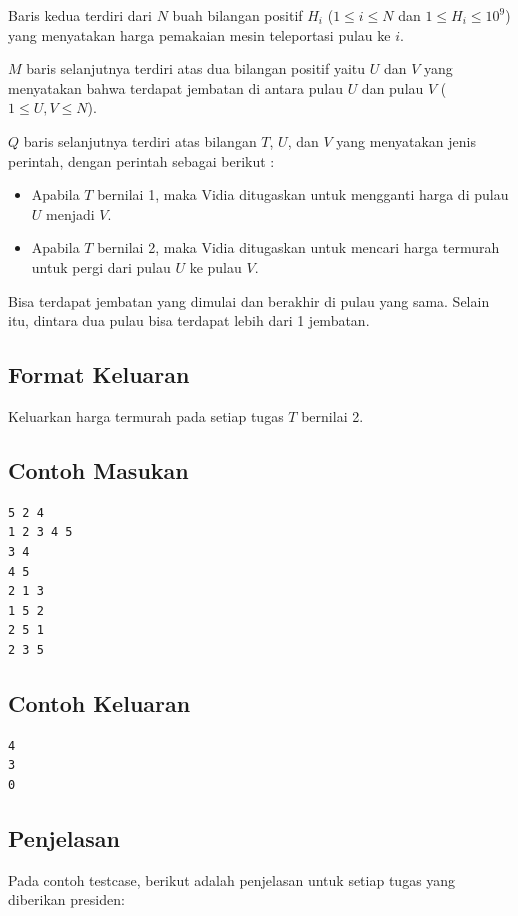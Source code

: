 \documentclass{article}
\begin{document}
Baris kedua terdiri dari $N$ buah bilangan positif $H_i$ ($1 \leq i \leq N$ dan $1\leq H_i \leq 10^9$) yang menyatakan harga pemakaian mesin teleportasi pulau ke $i$.

$M$ baris selanjutnya terdiri atas dua bilangan positif yaitu $U$ dan $V$ yang menyatakan bahwa terdapat jembatan di antara pulau $U$ dan pulau $V$ ($1 \leq U,V \leq N$).

$Q$ baris selanjutnya terdiri atas bilangan $T$, $U$, dan $V$ yang menyatakan jenis perintah, dengan perintah sebagai berikut :

\begin{itemize}
    \item Apabila $T$ bernilai 1, maka Vidia ditugaskan untuk mengganti harga di pulau $U$ menjadi $V$.
    \item Apabila $T$ bernilai 2, maka Vidia ditugaskan untuk mencari harga termurah untuk pergi dari pulau $U$ ke pulau $V$.
\end{itemize}

Bisa terdapat jembatan yang dimulai dan berakhir di pulau yang sama. Selain itu, dintara dua pulau bisa terdapat lebih dari 1 jembatan.

\subsection*{Format Keluaran}
Keluarkan harga termurah pada setiap tugas $T$ bernilai 2.

\pagebreak
\begin{multicols}{2}
\subsection*{Contoh Masukan}
\begin{lstlisting}
5 2 4
1 2 3 4 5
3 4
4 5
2 1 3
1 5 2
2 5 1
2 3 5
\end{lstlisting}
\columnbreak
\subsection*{Contoh Keluaran}
\begin{lstlisting}
4
3
0
\end{lstlisting}
\vfill
\null
\end{multicols}

\subsection*{Penjelasan}
Pada contoh testcase, berikut adalah penjelasan untuk setiap tugas yang diberikan presiden:
\end{document}
